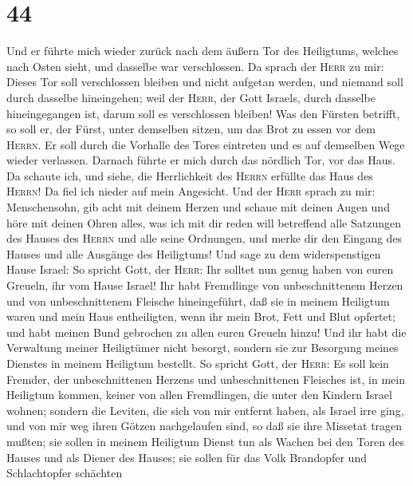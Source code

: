 \hypertarget{section-43}{%
\section{44}\label{section-43}}

 Und er führte mich wieder zurück nach dem äußern Tor des
Heiligtums, welches nach Osten sieht, und dasselbe war verschlossen.
 Da sprach der \textsc{Herr} zu mir: Dieses Tor soll
verschlossen bleiben und nicht aufgetan werden, und niemand soll durch
dasselbe hineingehen; weil der \textsc{Herr}, der Gott Israels, durch
dasselbe hineingegangen ist, darum soll es verschlossen bleiben!
 Was den Fürsten betrifft, so soll er, der Fürst, unter
demselben sitzen, um das Brot zu essen vor dem \textsc{Herrn}. Er soll
durch die Vorhalle des Tores eintreten und es auf demselben Wege wieder
verlassen.  Darnach führte er mich durch das nördlich Tor,
vor das Haus. Da schaute ich, und siehe, die Herrlichkeit des
\textsc{Herrn} erfüllte das Haus des \textsc{Herrn}! Da fiel ich nieder
auf mein Angesicht.  Und der \textsc{Herr} sprach zu mir:
Menschensohn, gib acht mit deinem Herzen und schaue mit deinen Augen und
höre mit deinen Ohren alles, was ich mit dir reden will betreffend alle
Satzungen des Hauses des \textsc{Herrn} und alle seine Ordnungen, und
merke dir den Eingang des Hauses und alle Ausgänge des Heiligtums!
 Und sage zu dem widerspenstigen Hause Israel: So spricht
Gott, der \textsc{Herr}: Ihr solltet nun genug haben von euren Greueln,
ihr vom Hause Israel!  Ihr habt Fremdlinge von
unbeschnittenem Herzen und von unbeschnittenem Fleische hineingeführt,
daß sie in meinem Heiligtum waren und mein Haus entheiligten, wenn ihr
mein Brot, Fett und Blut opfertet; und habt meinen Bund gebrochen zu
allen euren Greueln hinzu!  Und ihr habt die Verwaltung
meiner Heiligtümer nicht besorgt, sondern sie zur Besorgung meines
Dienstes in meinem Heiligtum bestellt.  So spricht Gott,
der \textsc{Herr}: Es soll kein Fremder, der unbeschnittenen Herzens und
unbeschnittenen Fleisches ist, in mein Heiligtum kommen, keiner von
allen Fremdlingen, die unter den Kindern Israel wohnen; 
sondern die Leviten, die sich von mir entfernt haben, als Israel irre
ging, und von mir weg ihren Götzen nachgelaufen sind, so daß sie ihre
Missetat tragen mußten;  sie sollen in meinem Heiligtum
Dienst tun als Wachen bei den Toren des Hauses und als Diener des
Hauses; sie sollen für das Volk Brandopfer und Schlachtopfer schächten
